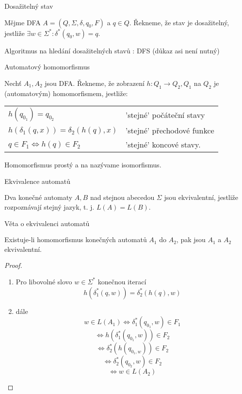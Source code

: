 \documentclass[../main.tex]{subfiles}
\begin{document}
\begin{definition}
    Dosažitelný stav

    Mějme DFA $A = (Q,\Sigma,\delta,q_0,F)$ a $q\in Q$. Řekneme, že stav je dosažitelný,
    jestliže $\exists w \in \Sigma^* : \delta^*(q_0,w) = q$.
\end{definition}
\begin{example}
    Algoritmus na hledání dosažitelných stavů : DFS (důkaz asi není nutný)
\end{example}
\begin{definition}
    Automatový homomorfismus

    Nechť $A_1,A_2$ jsou DFA. Řekneme, že zobrazení $h: Q_1 \rightarrow Q_2, Q_1$ na $Q_2$ je 
    (automatovým) homomorfismem, jestliže:\\
    \begin{center}
        \begin{tabular}{l l}
            $h(q_{0_1})=q_{0_2}$ & 'stejné' počáteční stavy \\
            $h(\delta_1(q,x)) = \delta_2(h(q),x)$ & 'stejné' přechodové funkce \\
            $q \in F_1 \Leftrightarrow h(q) \in F_2$ & 'stejné' koncové stavy. \\
        \end{tabular}
    \end{center}
    Homomorfismus prostý a na nazývame isomorfismus.
\end{definition}
\begin{definition}
    Ekvivalence automatů

    Dva konečné automaty $A,B$ nad stejnou abecedou $\Sigma$ jsou ekvivalentní, jestliže
    rozpoznávají stejný jazyk, t. j. $L(A) = L(B)$.
\end{definition}
\begin{theorem}
    Věta o ekvivalenci automatů

    Existuje-li homomorfismus konečných automatů $A_1$ do $A_2$, pak jsou $A_1$ a $A_2$
    ekvivalentní.

    \begin{proof}
        \begin{enumerate}
            \item Pro libovolné slovo $w\in \Sigma^*$ konečnou iterací
            \[h(\delta^*_1(q,w)) = \delta^*_2(h(q),w)\]
            \item dále
            \[w\in L(A_1) \Leftrightarrow \delta^*_1(q_{0_1},w)\in F_1\]
            \[\Leftrightarrow h(\delta^*_1(q_{0_1},w)) \in F_2\]
            \[\Leftrightarrow \delta^*_2(h(q_{0_1,w}))\in F_2\]
            \[\Leftrightarrow \delta^*_2(q_{0_2},w)\in F_2\]
            \[\Leftrightarrow w\in L(A_2)\]
        \end{enumerate}
    \end{proof}
\end{theorem}
\end{document}

